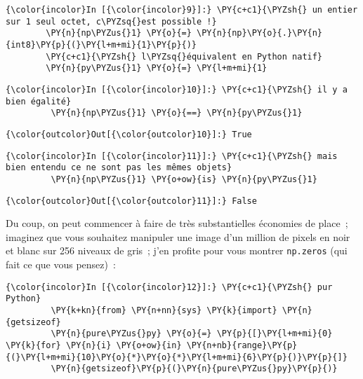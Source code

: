    \begin{Verbatim}[commandchars=\\\{\}]
{\color{incolor}In [{\color{incolor}9}]:} \PY{c+c1}{\PYZsh{} un entier sur 1 seul octet, c\PYZsq{}est possible !}
        \PY{n}{np\PYZus{}1} \PY{o}{=} \PY{n}{np}\PY{o}{.}\PY{n}{int8}\PY{p}{(}\PY{l+m+mi}{1}\PY{p}{)}
        \PY{c+c1}{\PYZsh{} l\PYZsq{}équivalent en Python natif}
        \PY{n}{py\PYZus{}1} \PY{o}{=} \PY{l+m+mi}{1}
\end{Verbatim}


    \begin{Verbatim}[commandchars=\\\{\}]
{\color{incolor}In [{\color{incolor}10}]:} \PY{c+c1}{\PYZsh{} il y a bien égalité}
         \PY{n}{np\PYZus{}1} \PY{o}{==} \PY{n}{py\PYZus{}1}
\end{Verbatim}


\begin{Verbatim}[commandchars=\\\{\}]
{\color{outcolor}Out[{\color{outcolor}10}]:} True
\end{Verbatim}
            
    \begin{Verbatim}[commandchars=\\\{\}]
{\color{incolor}In [{\color{incolor}11}]:} \PY{c+c1}{\PYZsh{} mais bien entendu ce ne sont pas les mêmes objets}
         \PY{n}{np\PYZus{}1} \PY{o+ow}{is} \PY{n}{py\PYZus{}1}
\end{Verbatim}


\begin{Verbatim}[commandchars=\\\{\}]
{\color{outcolor}Out[{\color{outcolor}11}]:} False
\end{Verbatim}
            
    Du coup, on peut commencer à faire de très substantielles économies de
place~; imaginez que vous souhaitez manipuler une image d'un million de
pixels en noir et blanc sur 256 niveaux de gris~; j'en profite pour vous
montrer \texttt{np.zeros} (qui fait ce que vous pensez)~:

    \begin{Verbatim}[commandchars=\\\{\}]
{\color{incolor}In [{\color{incolor}12}]:} \PY{c+c1}{\PYZsh{} pur Python}
         \PY{k+kn}{from} \PY{n+nn}{sys} \PY{k}{import} \PY{n}{getsizeof}
         \PY{n}{pure\PYZus{}py} \PY{o}{=} \PY{p}{[}\PY{l+m+mi}{0} \PY{k}{for} \PY{n}{i} \PY{o+ow}{in} \PY{n+nb}{range}\PY{p}{(}\PY{l+m+mi}{10}\PY{o}{*}\PY{o}{*}\PY{l+m+mi}{6}\PY{p}{)}\PY{p}{]}
         \PY{n}{getsizeof}\PY{p}{(}\PY{n}{pure\PYZus{}py}\PY{p}{)}
\end{Verbatim}


